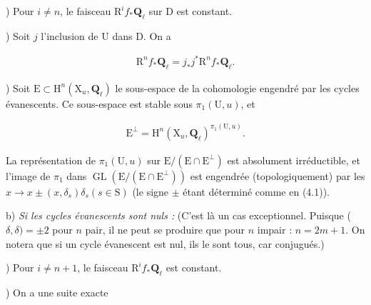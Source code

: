 \documentclass[10pt,leqno]{article}
\begin{document}
) Pour \(i\ne n\), le faisceau \(\mathrm{R}^{i} f_{*}\mathbf{Q}_{\ell }\) sur \(\mathrm{D}\) est constant.\par

) Soit \(j\) l’inclusion de \(\mathrm{U}\) dans \(\mathrm{D}\). On a\par

\begin{equation*}\begin{gathered}\mathrm{R}^{n} f_{*}\mathbf{Q}_{\ell } = j_{*}j^{*}\mathrm{R}^{n} f_{*}\mathbf{Q}_{\ell }.\end{gathered}\end{equation*}

) Soit \(\mathrm{E}\subset \mathrm{H}^{n}(\mathrm{X}_{u},\mathbf{Q}_{\ell })\) le sous-espace de la cohomologie engendré par les cycles évanescents. Ce sous-espace est stable sous \(\pi _{1}(\mathrm{U},u)\), et\par

\begin{equation*}\begin{gathered}\mathrm{E}^{\perp } = \mathrm{H}^{n}(\mathrm{X}_{u},\mathbf{Q}_{\ell })^{\pi _{1}(\mathrm{U},u)}.\end{gathered}\end{equation*}

\noindent La représentation de \(\pi _{1}(\mathrm{U},u)\) sur \(\mathrm{E}/(\mathrm{E}\cap \mathrm{E}^{\perp })\) est absolument irréductible, et l’image de \(\pi _{1}\) dans \(\operatorname{GL}(\mathrm{E}/(\mathrm{E}\cap \mathrm{E}^{\perp }))\) est engendrée (topologiquement) par les \(x\longrightarrow x\pm (x,\delta _{s})\delta _{s} (s\in \mathrm{S})\) (le signe \(\pm \) étant déterminé comme en (4.1)).\par

\clearpage

\label{physical-22}

\noindent b) \emph{Si les cycles évanescents sont nuls :} (C’est là un cas exceptionnel. Puisque (\(\delta ,\delta )=\pm 2\) pour \(n\) pair, il ne peut se produire que pour \(n\) impair : \(n=2m+1\). On notera que si un cycle évanescent est nul, ils le sont tous, car conjugués.)\par

) Pour \(i\ne n+1\), le faisceau \(\mathrm{R}^{i} f_{*}\mathbf{Q}_{\ell }\) est constant.\par

) On a une suite exacte\par
\end{document}
